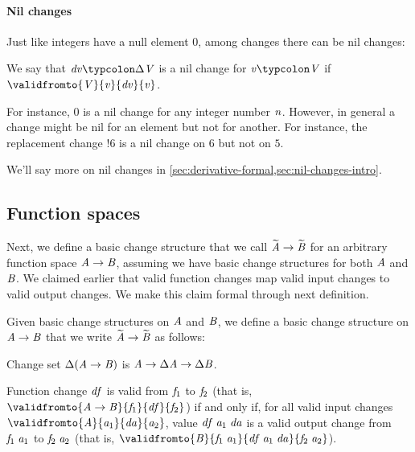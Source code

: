 \paragraph{Nil changes}
Just like integers have a null element \ensuremath{\mathrm{0}}, among changes there can be nil
changes:
\begin{definition}
  \label{def:nil-changes}
  We say that \ensuremath{\Varid{dv}\typcolon\Delta \Conid{V}} is a nil change for \ensuremath{\Varid{v}\typcolon\Conid{V}} if \ensuremath{\validfromto{\Conid{V}}{\Varid{v}}{\Varid{dv}}{\Varid{v}}}.
\end{definition}

For instance, \ensuremath{\mathrm{0}} is a nil change for any integer number \ensuremath{\Varid{n}}.
However, in general a change might be nil for an element but not
for another. For instance, the replacement change \ensuremath{\mathbin{!}\mathrm{6}} is a nil
change on \ensuremath{\mathrm{6}} but not on \ensuremath{\mathrm{5}}.

We'll say more on nil changes in \cref{sec:derivative-formal,sec:nil-changes-intro}.

\subsection{Function spaces}
Next, we define a basic change structure that we call \ensuremath{\widetilde{\Conid{A}}\to \widetilde{\Conid{B}}} for an arbitrary function space \ensuremath{\Conid{A}\to \Conid{B}}, assuming we have basic change
structures for both \ensuremath{\Conid{A}} and \ensuremath{\Conid{B}}.
%
We claimed earlier that valid function changes map valid input changes to valid
output changes. We make this claim formal through next definition.
\begin{definition}
  \label{def:basic-change-structure-funs}
  Given basic change structures on \ensuremath{\Conid{A}} and \ensuremath{\Conid{B}}, we define a basic change
  structure on \ensuremath{\Conid{A}\to \Conid{B}} that we write \ensuremath{\widetilde{\Conid{A}}\to \widetilde{\Conid{B}}} as follows:
  \begin{subdefinition}
  \item Change set \ensuremath{\Delta (\Conid{A}\to \Conid{B})} is \ensuremath{\Conid{A}\to \Delta \Conid{A}\to \Delta \Conid{B}}.
  \item Function change \ensuremath{\Varid{df}} is valid from \ensuremath{\Varid{f}_{1}}
    to \ensuremath{\Varid{f}_{2}} (that is, \ensuremath{\validfromto{\Conid{A}\to \Conid{B}}{\Varid{f}_{1}}{\Varid{df}}{\Varid{f}_{2}}}) if and only if,
    for all valid input changes \ensuremath{\validfromto{\Conid{A}}{\Varid{a}_{1}}{\Varid{da}}{\Varid{a}_{2}}}, value \ensuremath{\Varid{df}\;\Varid{a}_{1}\;\Varid{da}} is a valid
    output change from \ensuremath{\Varid{f}_{1}\;\Varid{a}_{1}} to \ensuremath{\Varid{f}_{2}\;\Varid{a}_{2}} (that is, \ensuremath{\validfromto{\Conid{B}}{\Varid{f}_{1}\;\Varid{a}_{1}}{\Varid{df}\;\Varid{a}_{1}\;\Varid{da}}{\Varid{f}_{2}\;\Varid{a}_{2}}}).
  \end{subdefinition}
\end{definition}

